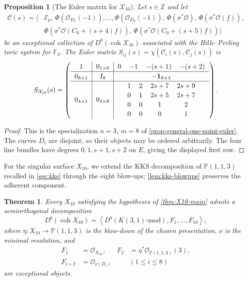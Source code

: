 \documentclass[11pt]{article}
\theoremstyle{plain}
\newtheorem{theorem}{Theorem}[section]
\newtheorem{proposition}[proposition]{Proposition}
\theoremstyle{definition}
\theoremstyle{remark}
\newcommand{\Pp}{\mathbb P}
\newcommand{\F}{\mathbb F}
\newcommand{\Z}{\mathbb Z}
\newcommand{\Db}{D^b}
\newcommand{\coh}{\operatorname{coh}}
\newcommand{\OO}{\mathcal O}
\begin{document}
\begin{proposition}[The Euler matrix for \(\mathcal X_{10}\)]
\label{prop:X10-euler-form}
Let \(s\in\Z\) and let
\[
\begin{aligned}
\mathcal C(s)=
\big\langle
&\mathcal E_p,\,
\Phi(\OO_{D_1}(-1)),\ldots,\Phi(\OO_{D_8}(-1)),\,
\Phi(\sigma^*\OO),\,\Phi(\sigma^*\OO(f)),\\
&\Phi(\sigma^*\OO(C_0+(s+4)f)),\,
\Phi(\sigma^*\OO(C_0+(s+5)f))
\big\rangle
\end{aligned}
\]
be an exceptional collection of \(D^b(\coh \mathcal X_{10})\) associated with the Hille--Perling toric system for \(\F_3\). The Euler matrix \(S_{ij}(s)=\chi(\mathcal C_i(s),\mathcal C_j(s))\)
is
\[
\begingroup
\setlength{\arraycolsep}{6pt}
\renewcommand{\arraystretch}{1.15}
S_{\mathcal X_{10}}(s)
=
\left(
\begin{array}{c|c|c}
1
&
0_{1\times 8}
&
\begin{matrix}
0&-1&-(s+1)&-(s+2)
\end{matrix}
\\ \hline
0_{8\times 1}
&
I_8
&
-\mathbf 1_{8\times 4}
\\ \hline
0_{4\times 1}
&
0_{4\times 8}
&
\begin{matrix}
1&2&2s+7&2s+9\\
0&1&2s+5&2s+7\\
0&0&1&2\\
0&0&0&1
\end{matrix}
\end{array}
\right).
\endgroup
\]

\end{proposition}

\begin{proof}
This is the specialization \(n=3\), \(m=8\) of
\cref{prop:general-one-point-euler}. The curves \(D_i\) are disjoint,
so their objects may be ordered arbitrarily. The four line bundles have degrees
\(0,1,s+1,s+2\) on \(E\), giving the displayed first row.
\end{proof}


For the singular surface \(X_{10}\), we extend the KKS decomposition of
\(\Pp(1,1,3)\) recalled in \cref{sec:kks} through the eight blow-ups;
\cref{lem:kks-blowups} preserves the adherent component.

\begin{theorem}
\label{thm:X10-kks-sod}
Every \(X_{10}\) satisfying the hypotheses of \cref{thm:X10-main}
admits a semiorthogonal decomposition
\[
\Db(\coh X_{10})
=
\left\langle
\Db(K(3,1)\text{-mod}),F_1,\dots,F_{10}
\right\rangle,
\]
where \(\eta:X_{10}\to\Pp(1,1,3)\) is the blow-down of the chosen
presentation, \(\nu\) is the minimal resolution, and
\[
\begin{aligned}
F_1&=\OO_{X_{10}},&F_2&=\eta^*\OO_{\Pp(1,1,3)}(3),\\
F_{i+2}&=\OO_{\nu(D_i)}&& (1\leq i\leq8)
\end{aligned}
\]
are exceptional objects.
\end{theorem}
\end{document}
